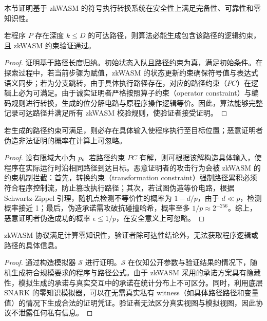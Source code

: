 本节证明基于 zkWASM 的符号执行转换系统在安全性上满足完备性、可靠性和零知识性。

\begin{theorem}[完备性]
若程序 $P$ 存在深度 $k \leq D$ 的可达路径，则算法必能生成包含该路径的逻辑约束，且 zkWASM 约束验证通过。
\end{theorem}

\begin{proof}
证明基于路径长度归纳。初始状态入队且路径约束为真，满足初始条件。在探索过程中，若当前步骤为赋值，zkWASM 的状态更新约束确保符号值与表达式语义同步；若为分支跳转，由于具体执行路径存在，对应的路径约束（$PC$）在逻辑上必为可满足。由于诚实证明者严格按照算子约束（operator constraint）与编码规则进行转换，生成的位分解电路与原程序操作逻辑等价。因此，算法能够完整记录可达路径并满足所有 zkWASM 校验规则，使验证者接受证明。
\end{proof}

\begin{theorem}[可靠性]
若生成的路径约束可满足，则必存在具体输入使程序执行至目标位置；恶意证明者伪造非法证明的概率在计算上可忽略。
\end{theorem}

\begin{proof}
设有限域大小为 $p$。若路径约束 $PC$ 有解，则可根据该解构造具体输入，使程序在实际运行时沿相同路径到达目标。恶意证明者的攻击行为会被 zkWASM 的约束机制拦截：首先，转换约束（transformation constraint）强制路径累积必须符合程序控制流，防止篡改执行路径；其次，若试图伪造等价电路，根据 Schwartz-Zippel 引理，随机点检测不等价性的概率为 $1 - d/p$，由于 $d \ll p$，检测概率接近 1；最后，伪造承诺需攻破抗碰撞哈希，概率至多 $1/p \approx 2^{-256}$。综上，恶意证明者伪造成功的概率 $\epsilon \leq 1/p$，在安全意义上可忽略。
\end{proof}

\begin{theorem}[零知识性]
zkWASM 协议满足计算零知识性，验证者除可达性结论外，无法获取程序逻辑或路径的具体信息。
\end{theorem}

\begin{proof}
通过构造模拟器 $\mathcal{S}$ 进行证明。$\mathcal{S}$ 在仅知公开参数与验证结果的情况下，随机生成符合规模要求的程序与路径公式。由于 zkWASM 采用的承诺方案具有隐藏性，模拟生成的承诺与真实交互中的承诺在统计分布上不可区分。同时，利用底层 SNARK 的零知识模拟器，可以在无需真实私有 witness（如具体路径路径和变量值）的情况下生成合法的证明凭证。验证者无法区分真实视图与模拟视图，因此协议不泄露任何私有信息。
\end{proof}

